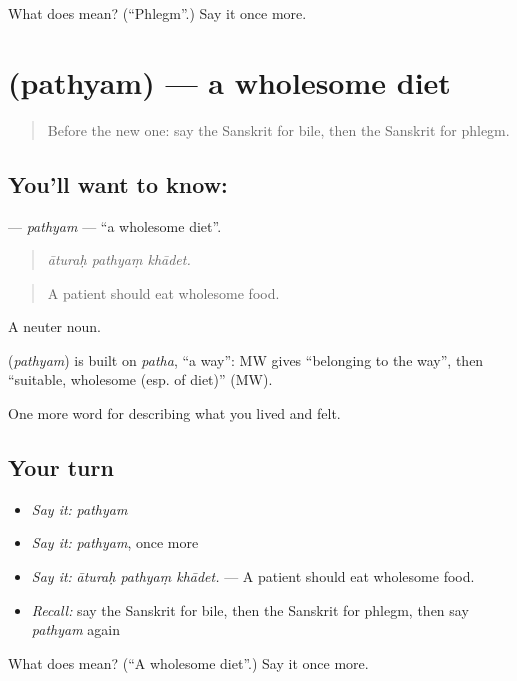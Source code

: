 \begin{tcolorbox}[breakable,colback=teal!4,colframe=teal!35!black,title={Before you move on}]
What does  mean? (\textquotedblleft{}Phlegm\textquotedblright{}.) Say it once more.
\end{tcolorbox}
\section[\texorpdfstring{\sk{पथ्यम्} (pathyam)}{पथ्यम् (pathyam)}]{ (pathyam) — a wholesome diet}

\label{lesson:SA-C484-pathyam}



\begin{quote}
Before the new one: say the Sanskrit for bile, then the Sanskrit for phlegm.
\end{quote}

\subsection*{You'll want to know: }
\textbf{} — \emph{pathyam} — \textquotedblleft{}a wholesome diet\textquotedblright{}.

\begin{quote}
  
\end{quote}

\begin{quote}
\emph{āturaḥ pathyaṃ khādet.}
\end{quote}

\begin{quote}
A patient should eat wholesome food.
\end{quote}

A neuter noun.

\begin{cousinweb}
\textbf{} (\emph{pathyam}) is built on \emph{patha}, \textquotedblleft{}a way\textquotedblright{}: MW gives \textquotedblleft{}belonging to the way\textquotedblright{}, then \textquotedblleft{}suitable, wholesome (esp. of diet)\textquotedblright{} (MW).
\end{cousinweb}

\begin{grammarlens}[title={What you've built}]
One more word for describing what you lived and felt.
\end{grammarlens}

\subsection*{Your turn}
\begin{itemize}
\raggedright
  \item \emph{Say it:} \emph{pathyam}
  \item \emph{Say it:} \emph{pathyam}, once more
  \item \emph{Say it:} \emph{āturaḥ pathyaṃ khādet.} — A patient should eat wholesome food.
  \item \emph{Recall:} say the Sanskrit for bile, then the Sanskrit for phlegm, then say \emph{pathyam} again
\end{itemize}

\begin{tcolorbox}[breakable,colback=teal!4,colframe=teal!35!black,title={Before you move on}]
What does  mean? (\textquotedblleft{}A wholesome diet\textquotedblright{}.) Say it once more.
\end{tcolorbox}
